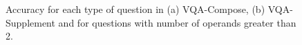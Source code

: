     \begin{figure}
        \centering
            \\
            \\
        \caption{Accuracy for each type of question in (a) VQA-Compose, (b) VQA-Supplement and for questions with number of operands greater than 2.}
        \label{fig:heatmap}
    \end{figure}